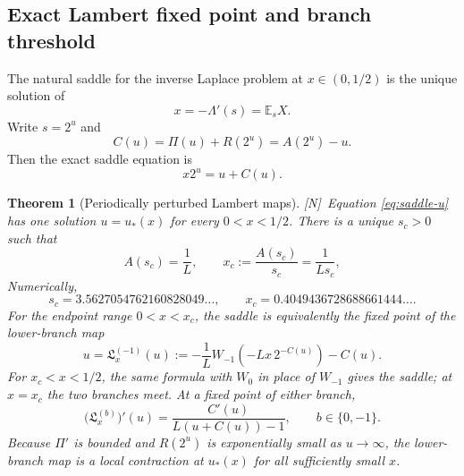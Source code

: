 \documentclass[11pt,oneside]{article}
\newtheorem{theorem}{Theorem}[section]
\theoremstyle{definition}
\theoremstyle{remark}
\newcommand{\E}{\mathbb E}
\newcommand{\statusN}{\textsf{[N]}}
\begin{document}
\subsection{Exact Lambert fixed point and branch threshold}
The natural saddle for the inverse Laplace problem at $x\in(0,1/2)$ is the unique solution
of
\begin{equation}
 x=-\Lambda'(s)=\E_sX.                                    \label{eq:saddle-s}
\end{equation}
Write $s=2^u$ and
\begin{equation}
 C(u)=\Pi(u)+R(2^u)=A(2^u)-u.                              \label{eq:C-u}
\end{equation}
Then the exact saddle equation is
\begin{equation}
 x2^u=u+C(u).                                               \label{eq:saddle-u}
\end{equation}

\begin{theorem}[Periodically perturbed Lambert maps]\label{thm:periodic-W}
\statusN\ Equation \eqref{eq:saddle-u} has one solution $u=u_*(x)$ for every
$0<x<1/2$.  There is a unique $s_c>0$ such that
\begin{equation}
 A(s_c)=\frac1L,
 \qquad
 x_c:=\frac{A(s_c)}{s_c}=\frac1{Ls_c},                    \label{eq:xc-def}
\end{equation}
Numerically,
\begin{equation}
 s_c=3.5627054762160828049\ldots,
 \qquad x_c=0.4049436728688661444\ldots.                  \label{eq:xc-num}
\end{equation}
For the endpoint range $0<x<x_c$, the saddle is equivalently the fixed point of the
lower-branch map
\begin{equation}
 \boxed{
 u=\mathfrak L_x^{(-1)}(u):=-\frac1L
 W_{-1}\!\left(-Lx\,2^{-C(u)}\right)-C(u).}                \label{eq:W-map}
\end{equation}
For $x_c<x<1/2$, the same formula with $W_0$ in place of $W_{-1}$ gives the saddle; at
$x=x_c$ the two branches meet.  At a fixed point of either branch,
\begin{equation}
 \boxed{
 \bigl(\mathfrak L_x^{(b)}\bigr)'(u)
 =\frac{C'(u)}{L(u+C(u))-1},\qquad b\in\{0,-1\}.}          \label{eq:W-derivative}
\end{equation}
Because $\Pi'$ is bounded and $R(2^u)$ is exponentially small as $u\to\infty$, the
lower-branch map is a local contraction at $u_*(x)$ for all sufficiently small $x$.
\end{theorem}
\end{document}
